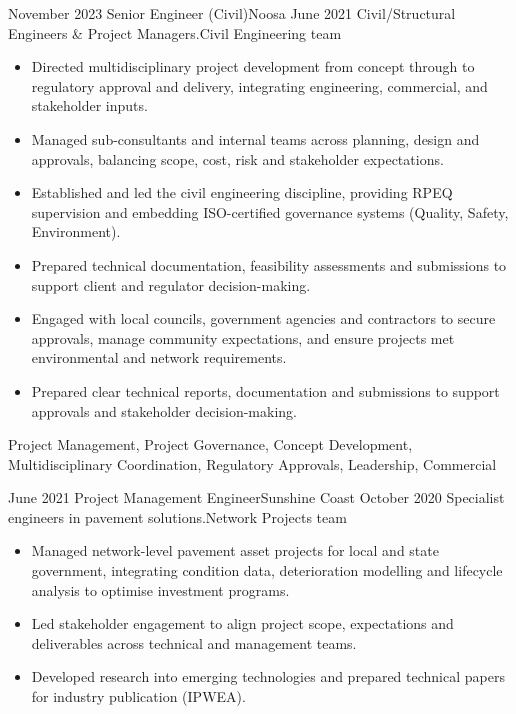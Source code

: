 \begin{experiences}
\emptySeparator

  \consultantexperience
	{November 2023}    {Senior Engineer (Civil)}{}{Noosa}
	{June 2021}   {Civil/Structural Engineers \& Project Managers.}{Civil Engineering team}
	{                  
		\begin{itemize}
			\item Directed multidisciplinary project development from concept through to regulatory approval and delivery, integrating engineering, commercial, and stakeholder inputs.
			\item Managed sub-consultants and internal teams across planning, design and approvals, balancing scope, cost, risk and stakeholder expectations.
			\item Established and led the civil engineering discipline, providing RPEQ supervision and embedding ISO-certified governance systems (Quality, Safety, Environment).
			\item Prepared technical documentation, feasibility assessments and submissions to support client and regulator decision-making.
			\item Engaged with local councils, government agencies and contractors to secure approvals, manage community expectations, and ensure projects met environmental and network requirements.
			\item Prepared clear technical reports, documentation and submissions to support approvals and stakeholder decision-making.
\end{itemize}
}
{Project Management, Project Governance, Concept Development, Multidisciplinary Coordination, Regulatory Approvals, Leadership, Commercial}
	\emptySeparator   

  \consultantexperience
  {June 2021}    {Project Management Engineer}{}{Sunshine Coast}
  {October 2020}   {Specialist engineers in pavement solutions.}{Network Projects team}
  		{                 
                      \begin{itemize}
	\item Managed network-level pavement asset projects for local and state government, integrating condition data, deterioration modelling and lifecycle analysis to optimise investment programs.
	\item Led stakeholder engagement to align project scope, expectations and deliverables across technical and management teams.
	\item Developed research into emerging technologies and prepared technical papers for industry publication (IPWEA).


\end{itemize}}
\end{experiences}
